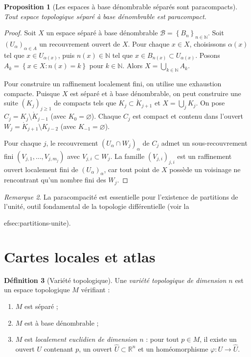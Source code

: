 \documentclass[12pt,a4paper,openany]{book}
\theoremstyle{definition}
\newtheorem{definition}{Définition}[chapter]
\theoremstyle{plain}
\newtheorem{proposition}[definition]{Proposition}
\theoremstyle{remark}
\newtheorem{remarque}[definition]{Remarque}
\newcommand{\N}{\mathbb{N}}
\newcommand{\R}{\mathbb{R}}
\newcommand{\set}[1]{\left\{#1\right\}}
\begin{document}
\begin{proposition}[Les espaces à base dénombrable séparés sont paracompacts]\label{prop:denombrable-paracompact}
Tout espace topologique séparé à base dénombrable est paracompact.
\end{proposition}

\begin{proof}
Soit $X$ un espace séparé à base dénombrable $\mathcal{B} = \set{B_n}_{n \in \N}$.
Soit $(U_\alpha)_{\alpha \in A}$ un recouvrement ouvert de $X$. Pour chaque
$x \in X$, choisissons $\alpha(x)$ tel que $x \in U_{\alpha(x)}$, puis
$n(x) \in \N$ tel que $x \in B_{n(x)} \subset U_{\alpha(x)}$. Posons $A_k =
\set{x \in X : n(x) = k}$ pour $k \in \N$. Alors $X = \bigcup_{k \in \N} A_k$.

Pour construire un raffinement localement fini, on utilise une exhaustion
compacte. Puisque $X$ est séparé et à base dénombrable, on peut construire une
suite $(K_j)_{j \geq 1}$ de compacts tels que $K_j \subset \mathring{K}_{j+1}$
et $X = \bigcup_{j} K_j$. On pose $C_j = K_j \setminus \mathring{K}_{j-1}$
(avec $K_0 = \varnothing$). Chaque $C_j$ est compact et contenu dans l'ouvert
$W_j = \mathring{K}_{j+1} \setminus K_{j-2}$ (avec $K_{-1} = \varnothing$).

Pour chaque $j$, le recouvrement $(U_\alpha \cap W_j)_\alpha$ de $C_j$ admet
un sous-recouvrement fini $(V_{j,1}, \ldots, V_{j,m_j})$ avec $V_{j,i} \subset
W_j$. La famille $(V_{j,i})_{j,i}$ est un raffinement ouvert localement fini
de $(U_\alpha)_\alpha$, car tout point de $X$ possède un voisinage ne
rencontrant qu'un nombre fini des $W_j$.
\end{proof}

\begin{remarque}\label{rem:importance-paracompacite}
La paracompacité est essentielle pour l'existence de partitions de l'unité,
outil fondamental de la topologie différentielle (voir la

ef{sec:partitions-unite}).
\end{remarque}


\section{Cartes locales et atlas}
\label{sec:cartes-atlas}

\begin{definition}[Variété topologique]\label{def:variete-topo}
Une \emph{variété topologique de dimension $n$} est un espace topologique $M$
vérifiant :
\begin{enumerate}[label=(\roman*)]
    \item $M$ est séparé ;
    \item $M$ est à base dénombrable ;
    \item $M$ est \emph{localement euclidien de dimension $n$} : pour tout $p
    \in M$, il existe un ouvert $U$ contenant $p$, un ouvert $\widehat{U}
    \subset \R^n$ et un homéomorphisme $\varphi \colon U \to \widehat{U}$.
\end{enumerate}
\end{definition}
\end{document}
